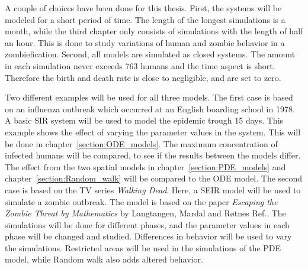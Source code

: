\documentclass[%
twoside,                 %
final,                   %
chapterprefix=true,      %
open=right               %
10pt]{book}
\begin{document}
\vspace{3mm}


A couple of choices have been done for this thesis. First, the systems will be modeled for a short period of time. The length of the longest simulations is a month, while the third chapter only consists of simulations with the length of half an hour. This is done to study variations of human and zombie behavior in a zombiefication. Second, all models are simulated as closed systems. The amount in each simulation never exceeds 763 humans and the time aspect is short. Therefore the birth and death rate is close to negligible, and are set to zero.    


\vspace{3mm}




\vspace{3mm}


Two different examples will be used for all three models. The first case is based on an influenza outbreak which occurred at an English boarding school in 1978. A basic SIR system will be used to model the epidemic trough 15 days. This example shows the effect of varying the parameter values in the system. This will be done in chapter~\ref{section:ODE_models}. The maximum concentration of infected humans will be compared, to see if the results between the models differ. The effect from the two spatial models in chapter~\ref{section:PDE_models} and chapter~\ref{section:Random_walk} will be compared to the ODE model. The second case is based on the TV series \emph{Walking Dead}. Here, a SEIR model will be used to simulate a zombie outbreak. The model is based on the paper \emph{Escaping the Zombie Threat by Mathematics} by Langtangen, Mardal and Røtnes Ref.\cite{zombie-math}. The simulations will be done for different phases, and the parameter values in each phase will be changed and studied. Differences in behavior will be used to vary the simulations. Restricted areas will be used in the simulations of the PDE model, while Random walk also adds altered behavior.


\vspace{3mm}




\vspace{3mm}
\end{document}

